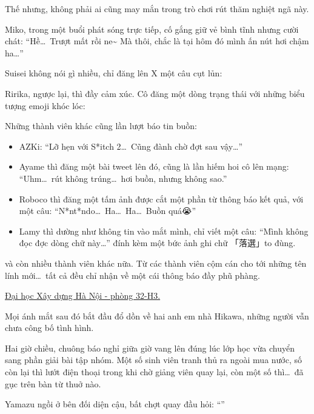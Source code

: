 \documentclass[../main.tex]{subfiles}
\begin{document}
\il

Thế nhưng, không phải ai cũng may mắn trong trò chơi rút thăm nghiệt ngã này.

Miko, trong một buổi phát sóng trực tiếp, cố gắng giữ vẻ bình tĩnh nhưng cười chát: ``Hề\dots\ Trượt mất rồi ne\~{} Mà thôi, chắc là tại hôm đó mình ấn nút hơi chậm ha\dots''

Suisei không nói gì nhiều, chỉ đăng lên X một câu cụt lủn:


Ririka, ngược lại, thì đầy cảm xúc. Cô đăng một dòng trạng thái với những biểu tượng emoji khóc lóc:


Những thành viên khác cũng lần lượt báo tin buồn:
\begin{itemize}
    \item AZKi: ``Lỡ hẹn với S*itch 2\dots\ Cũng đành chờ đợt sau vậy\dots''
    \item Ayame thì đăng một bài tweet lên đó, cũng là lần hiếm hoi cô lên mạng: ``Uhm\dots\ rút không trúng\dots\ hơi buồn, nhưng không sao.''
    \item Roboco thì đăng một tấm ảnh được cắt một phần từ thông báo kết quả, với một câu: ``N*nt*ndo\dots\ Ha\dots\ Ha\dots\ Buồn quá😭''
    \item Lamy thì dường như không tin vào mắt mình, chỉ viết một câu: ``Mình không đọc đợc dòng chữ này\dots'' đính kèm một bức ảnh ghi chữ 「落選」to đùng.
\end{itemize}

và còn nhiều thành viên khác nữa. Từ các thành viên cộm cán cho tới những tên lính mới\dots\ tất cả đều chỉ nhận về một cái thông báo đầy phũ phàng.

\il

\begin{center}
    \uline{Đại học Xây dựng Hà Nội - phòng 32-H3.}
\end{center}

Mọi ánh mắt sau đó bắt đầu đổ dồn về hai anh em nhà Hikawa, những người vẫn chưa công bố tình hình.

Hai giờ chiều, chuông báo nghỉ giữa giờ vang lên đúng lúc lớp học vừa chuyển sang phần giải bài tập nhóm. Một số sinh viên tranh thủ ra ngoài mua nước, số còn lại thì lướt điện thoại trong khi chờ giảng viên quay lại, còn một số thì\dots\ đã gục trên bàn từ thuở nào.

Yamazu ngồi ở bên đối diện cậu, bất chợt quay đầu hỏi: ``''
\end{document}
